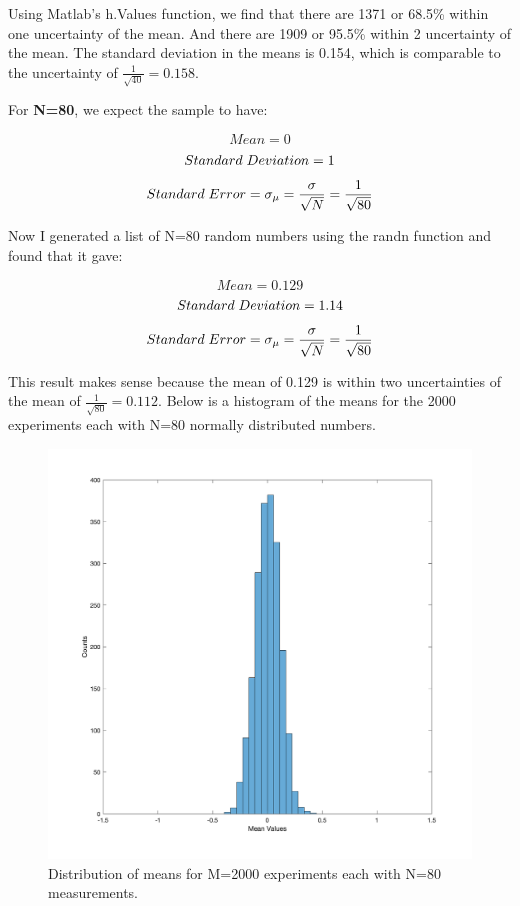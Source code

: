 \documentclass{article}
\begin{document}
Using Matlab’s h.Values function, we find that there are 1371 or 68.5\% within one uncertainty of the mean. And there are 1909 or 95.5\% within 2 uncertainty of the mean. The standard deviation in the means is 0.154, which is comparable to the uncertainty of $\frac{1}{\sqrt{40}}=0.158$.  \newline
  
  For \textbf{N=80}, we expect the sample to have:
 
 \[ Mean=0\]
  \[ Standard\hspace{1mm}Deviation=1\]
   \[ Standard\hspace{1mm}Error=\sigma_{\mu}=\frac{\sigma}{\sqrt{N}}=\frac{1}{\sqrt{80}}\] 


Now I generated a list of N=80 random numbers using the randn function and found that it gave:

 \[ Mean=0.129\]
  \[ Standard\hspace{1mm}Deviation=1.14\]
   \[ Standard\hspace{1mm}Error=\sigma_{\mu}=\frac{\sigma}{\sqrt{N}}=\frac{1}{\sqrt{80}}\]
   
     This result makes sense because the mean of 0.129 is within two uncertainties of the mean of $\frac{1}{\sqrt{80}}=0.112$. Below is a histogram of the means for the 2000 experiments each with N=80 normally distributed numbers.
 

   \begin{figure}[H]
  \centering
  \includegraphics[width=0.8\linewidth]{lateximages/Prob3_4_80.png}
  \caption{Distribution of means for M=2000 experiments each with N=80 measurements.}
  \label{fig:boat1}
  \end{figure}
\end{document}
